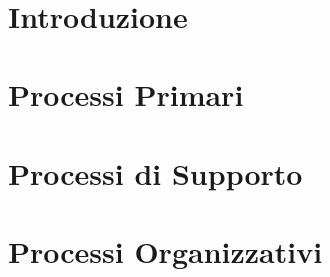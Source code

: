 \documentclass[12pt, a4paper,table]{article}
\title{\textsc{\docNome}}
\author{}
\date{}
\begin{document}


\tableofcontents
\newpage
\section{Introduzione}
    
\newpage
\section{Processi Primari} %
\newpage
\section{Processi di Supporto}
    
\newpage
\section{Processi Organizzativi}
\end{document}
